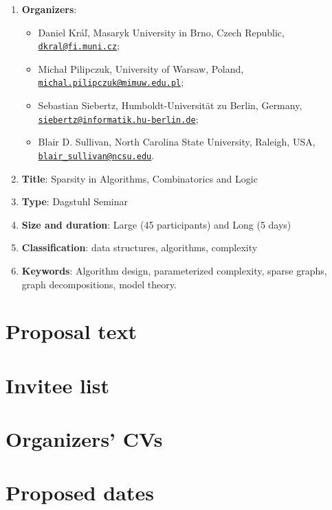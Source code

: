 \documentclass[10pt]{article}
\newcommand{\ourtitle}{Sparsity in Algorithms, Combinatorics and Logic}
\newcommand{\email}[1]{\href{mailto:#1}{\nolinkurl{#1}}}
\begin{document}
\begin{enumerate}
\item {\bf{Organizers}}:
\begin{itemize}
\item Daniel Kr\'a\v{l}, Masaryk University in Brno, Czech Republic, \email{dkral@fi.muni.cz};
\item Micha\l{} Pilipczuk, University of Warsaw, Poland, \email{michal.pilipczuk@mimuw.edu.pl};
\item Sebastian Siebertz, Humboldt-Universit\"at zu Berlin, Germany, \mbox{\email{siebertz@informatik.hu-berlin.de};}
\item Blair D. Sullivan, North Carolina State University, Raleigh, USA, \email{blair_sullivan@ncsu.edu}.
\end{itemize}
\item {\bf{Title}}: \ourtitle
\item {\bf{Type}}: Dagstuhl Seminar
\item {\bf{Size and duration}}: Large (45 participants) and Long (5 days)
\item {\bf{Classification}}: data structures, algorithms, complexity
\item {\bf{Keywords}}: Algorithm design, parameterized complexity, sparse graphs, graph decompositions, model theory.
\end{enumerate}

\pagebreak
\section{Proposal text}











\begin{footnotesize}


\end{footnotesize}

\pagebreak

\section{Invitee list}



\pagebreak

\section{Organizers' CVs}


\pagebreak

\pagebreak

\pagebreak


\section{Proposed dates}


\end{document}
